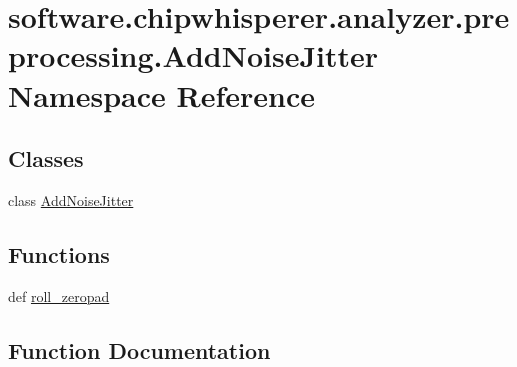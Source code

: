 \hypertarget{namespacesoftware_1_1chipwhisperer_1_1analyzer_1_1preprocessing_1_1AddNoiseJitter}{}\section{software.\+chipwhisperer.\+analyzer.\+preprocessing.\+Add\+Noise\+Jitter Namespace Reference}
\label{namespacesoftware_1_1chipwhisperer_1_1analyzer_1_1preprocessing_1_1AddNoiseJitter}
\subsection*{Classes}
\begin{DoxyCompactItemize}
\item 
class \hyperlink{classsoftware_1_1chipwhisperer_1_1analyzer_1_1preprocessing_1_1AddNoiseJitter_1_1AddNoiseJitter}{Add\+Noise\+Jitter}
\end{DoxyCompactItemize}
\subsection*{Functions}
\begin{DoxyCompactItemize}
\item 
def \hyperlink{namespacesoftware_1_1chipwhisperer_1_1analyzer_1_1preprocessing_1_1AddNoiseJitter_a790f3f20f0f53b393f42bd693cb5182a}{roll\+\_\+zeropad}
\end{DoxyCompactItemize}


\subsection{Function Documentation}
\hypertarget{namespacesoftware_1_1chipwhisperer_1_1analyzer_1_1preprocessing_1_1AddNoiseJitter_a790f3f20f0f53b393f42bd693cb5182a}{}
